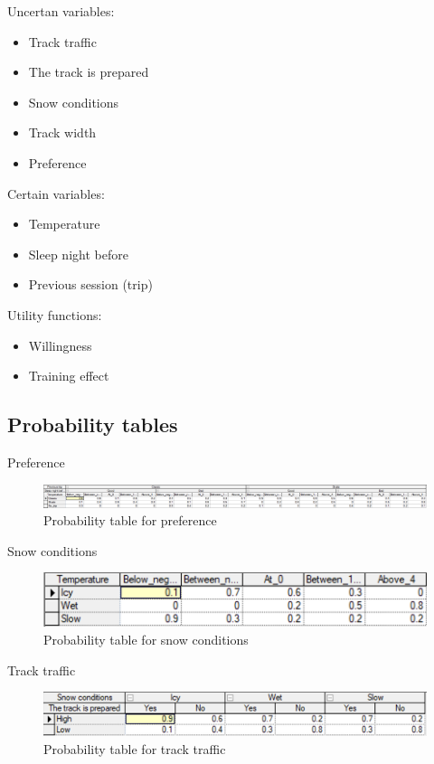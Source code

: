 \documentclass{article}
\begin{document}
Uncertan variables:
\begin{itemize}
    \item Track traffic
    \item The track is prepared
    \item Snow conditions
    \item Track width
    \item Preference
\end{itemize}

Certain variables:
\begin{itemize}
    \item Temperature
    \item Sleep night before
    \item Previous session (trip)
\end{itemize}

Utility functions:
\begin{itemize}
    \item Willingness
    \item Training effect
\end{itemize}

\subsection*{Probability tables}

Preference

\begin{figure}[h]
    \centering
    \includegraphics[width=\linewidth]{preference.png}
    \caption{Probability table for preference}
    \label{fig:image2}
\end{figure}

Snow conditions

\begin{figure}[h]
    \centering
    \includegraphics[width=\linewidth]{snow_conditions.png}
    \caption{Probability table for snow conditions}
    \label{fig:image3}
\end{figure}

Track traffic

\begin{figure}[h]
    \centering
    \includegraphics[width=\linewidth]{track_traffic.png}
    \caption{Probability table for track traffic}
    \label{fig:image4}
\end{figure}
\end{document}
